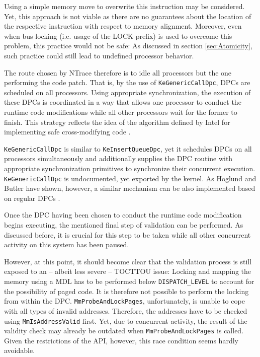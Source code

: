 
Using a simple memory move to overwrite this instruction may be considered. Yet, this 
approach is not viable as there are no guarantees about the location of the respective instruction with 
respect to memory alignment. Moreover, even when bus locking (i.e. usage of the LOCK prefix) is
used to overcome this problem, this practice would not be safe: As discussed
in section \ref{sec:Atomicity}, such practice could still lead to undefined processor
behavior. 

The route chosen by NTrace therefore is to idle all processors but the one performing
the code patch. That is, by the use of \verb|KeGenericCallDpc|, DPCs are scheduled on all
processors. Using appropriate synchronization, the execution of these DPCs is coordinated in a way
that allows one processor to conduct the runtime code modifications while all other processors
wait for the former to finish. This strategy reflects the idea of the algorithm defined
by Intel for implementing safe cross-modifying code \cite{intel07_3A}.

\verb|KeGenericCallDpc| is similar to \verb|KeInsertQueueDpc|, yet it schedules
DPCs on all processors simultaneously and additionally supplies the DPC routine with appropriate
synchronization primitives to synchronize their concurrent execution. \verb|KeGenericCallDpc|
is undocumented, yet exported by the kernel. As Hoglund and Butler have shown,
however, a similar mechanism can be also implemented based on regular DPCs \cite{Hoglund05}.

Once the DPC having been chosen to conduct the runtime code modification begins executing,
the mentioned final step of validation can be performed. As discussed before, it is crucial 
for this step to be taken while all other concurrent activity on this system has been paused.

However, at this point, it should become clear that the validation process is still
exposed to an -- albeit less severe -- TOCTTOU issue: Locking and mapping the memory 
using a MDL has to be performed below \verb|DISPATCH_LEVEL| to account for the possibility
of paged code. It is therefore not possible to perform the locking from within the DPC. 
\verb|MmProbeAndLockPages|, unfortunately, is unable to cope with all types of invalid addresses. 
Therefore, the addresses have to be checked using \verb|MmIsAddressValid| first. Yet,
due to concurrent activity, the result of the validity check may already be outdated
when \verb|MmProbeAndLockPages| is called. Given the restrictions of the API, however, 
this race condition seems hardly avoidable.

